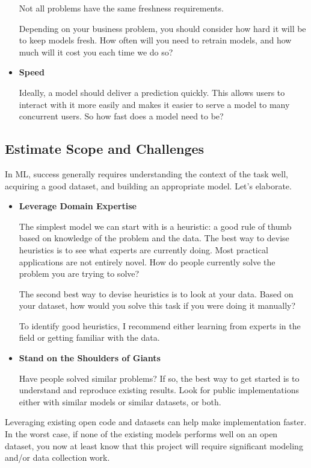 \begin{itemize}
    Not all problems have the same freshness requirements.

    Depending on your business problem, you should consider how hard it will
    be to keep models fresh. How often will you need to retrain models, and
    how much will it cost you each time we do so?


    \item \textbf{Speed}
    
    \noindent
    Ideally, a model should deliver a prediction quickly. This allows users
    to interact with it more easily and makes it easier to serve a model to
    many concurrent users. So how fast does a model need to be?


\end{itemize}



\subsection{Estimate Scope and Challenges}
In ML, success generally requires understanding the context of the task well,
acquiring a good dataset, and building an appropriate model. Let's elaborate.

\begin{itemize}
    \item \textbf{Leverage Domain Expertise}
    
    \noindent
    The simplest model we can start with is a heuristic: a good rule of thumb based on
    knowledge of the problem and the data. The best way to devise heuristics is to see
    what experts are currently doing. Most practical applications are not entirely novel.
    How do people currently solve the problem you are trying to solve?

    The second best way to devise heuristics is to look at your data. Based on your dataset,
    how would you solve this task if you were doing it manually?

    To identify good heuristics, I recommend either learning from experts in the field or
    getting familiar with the data.


    \item \textbf{Stand on the Shoulders of Giants}
    
    \noindent

    Have people solved similar problems? If so, the best way to get started is to understand
    and reproduce existing results. Look for public implementations either with
    similar models or similar datasets, or both.

\end{itemize}
Leveraging existing open code and datasets can help make
implementation faster. In the worst case, if none of the existing models performs well
on an open dataset, you now at least know that this project will require significant
modeling and/or data collection work.

